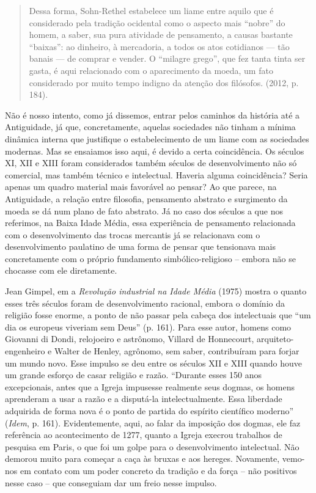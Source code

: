 \begin{quote}
Dessa forma, Sohn-Rethel estabelece um liame entre aquilo que é
considerado pela tradição ocidental como o aspecto mais ``nobre'' do
homem, a saber, sua pura atividade de pensamento, a causas bastante
``baixas'': ao dinheiro, à mercadoria, a todos os atos cotidianos ---
tão banais --- de comprar e vender. O ``milagre grego'', que fez tanta
tinta ser gasta, é aqui relacionado com o aparecimento da moeda, um fato
considerado por muito tempo indigno da atenção dos filósofos. (2012, p.
184).
\end{quote}

Não é nosso intento, como já dissemos, entrar pelos caminhos da história
até a Antiguidade, já que, concretamente, aquelas sociedades não tinham
a mínima dinâmica interna que justifique o estabelecimento de um liame
com as sociedades modernas. Mas se ensaiamos isso aqui, é devido a certa
coincidência. Os séculos XI, XII e XIII foram considerados também
séculos de desenvolvimento não só comercial, mas também técnico e
intelectual. Haveria alguma coincidência? Seria apenas um quadro
material mais favorável ao pensar? Ao que parece, na Antiguidade, a
relação entre filosofia, pensamento abstrato e surgimento da moeda se dá
num plano de fato abstrato. Já no caso dos séculos a que nos referimos,
na Baixa Idade Média, essa experiência de pensamento relacionada com o
desenvolvimento das trocas mercantis já se relacionava com o
desenvolvimento paulatino de uma forma de pensar que tensionava mais
concretamente com o próprio fundamento simbólico-religioso -- embora não
se chocasse com ele diretamente.

Jean Gimpel, em a \emph{Revolução industrial na Idade Média} (1975)
mostra o quanto esses três séculos foram de desenvolvimento racional,
embora o domínio da religião fosse enorme, a ponto de não passar pela
cabeça dos intelectuais que ``um dia os europeus viveriam sem Deus'' (p.
161). Para esse autor, homens como Giovanni di Dondi, relojoeiro e
astrônomo, Villard de Honnecourt, arquiteto-engenheiro e Walter de
Henley, agrônomo, sem saber, contribuíram para forjar um mundo novo.
Esse impulso se deu entre os séculos XII e XIII quando houve um grande
esforço de casar religião e razão. ``Durante esses 150 anos
excepcionais, antes que a Igreja impusesse realmente seus dogmas, os
homens aprenderam a usar a razão e a disputá-la intelectualmente. Essa
liberdade adquirida de forma nova é o ponto de partida do espírito
científico moderno'' (\emph{Idem}, p. 161). Evidentemente, aqui, ao
falar da imposição dos dogmas, ele faz referência ao acontecimento de
1277, quanto a Igreja execrou trabalhos de pesquisa em Paris, o que foi
um golpe para o desenvolvimento intelectual. Não demorou muito para
começar a caça às bruxas e aos hereges. Novamente, vemo-nos em contato
com um poder concreto da tradição e da força -- não positivos nesse caso
-- que conseguiam dar um freio nesse impulso.

